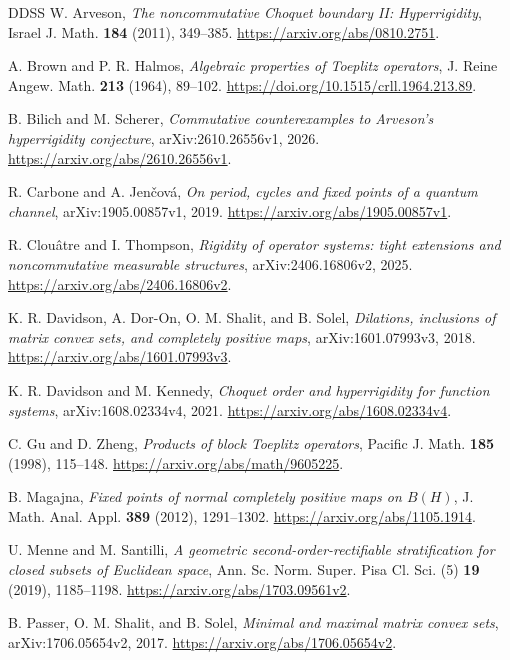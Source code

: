 \documentclass[11pt,letterpaper]{amsart}
\theoremstyle{definition}
\theoremstyle{remark}
\numberwithin{equation}{section}
\begin{document}
\clearpage
\begin{thebibliography}{DDSS}
W. Arveson, \emph{The noncommutative Choquet boundary II: Hyperrigidity},
Israel J. Math. \textbf{184} (2011), 349--385.
\url{https://arxiv.org/abs/0810.2751}.

A. Brown and P. R. Halmos, \emph{Algebraic properties of Toeplitz operators},
J. Reine Angew. Math. \textbf{213} (1964), 89--102.
\url{https://doi.org/10.1515/crll.1964.213.89}.

B. Bilich and M. Scherer, \emph{Commutative counterexamples to Arveson's
hyperrigidity conjecture}, arXiv:2610.26556v1, 2026.
\url{https://arxiv.org/abs/2610.26556v1}.

R. Carbone and A. Jen\v{c}ov\'a, \emph{On period, cycles and fixed points
of a quantum channel}, arXiv:1905.00857v1, 2019.
\url{https://arxiv.org/abs/1905.00857v1}.

R. Clou\^atre and I. Thompson, \emph{Rigidity of operator systems: tight
extensions and noncommutative measurable structures},
arXiv:2406.16806v2, 2025.
\url{https://arxiv.org/abs/2406.16806v2}.

K. R. Davidson, A. Dor-On, O. M. Shalit, and B. Solel,
\emph{Dilations, inclusions of matrix convex sets, and completely positive
maps}, arXiv:1601.07993v3, 2018.
\url{https://arxiv.org/abs/1601.07993v3}.

K. R. Davidson and M. Kennedy, \emph{Choquet order and hyperrigidity for
function systems}, arXiv:1608.02334v4, 2021.
\url{https://arxiv.org/abs/1608.02334v4}.

C. Gu and D. Zheng, \emph{Products of block Toeplitz operators},
Pacific J. Math. \textbf{185} (1998), 115--148.
\url{https://arxiv.org/abs/math/9605225}.

B. Magajna, \emph{Fixed points of normal completely positive maps on
$B(H)$}, J. Math. Anal. Appl. \textbf{389} (2012), 1291--1302.
\url{https://arxiv.org/abs/1105.1914}.

U. Menne and M. Santilli, \emph{A geometric second-order-rectifiable
stratification for closed subsets of Euclidean space},
Ann. Sc. Norm. Super. Pisa Cl. Sci. (5) \textbf{19} (2019), 1185--1198.
\url{https://arxiv.org/abs/1703.09561v2}.

B. Passer, O. M. Shalit, and B. Solel, \emph{Minimal and maximal matrix
convex sets}, arXiv:1706.05654v2, 2017.
\url{https://arxiv.org/abs/1706.05654v2}.


\end{thebibliography}
\end{document}
